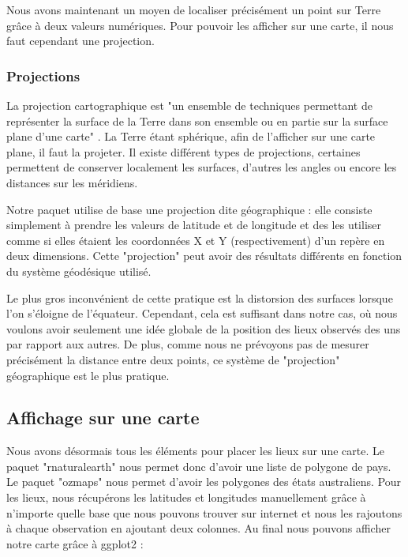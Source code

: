 \documentclass{article}
\begin{document}
Nous avons maintenant un moyen de localiser précisément un point sur Terre grâce à deux valeurs numériques. Pour pouvoir les afficher sur une carte, il nous faut cependant une projection.

\subsubsection{Projections}

La projection cartographique est "un ensemble de techniques permettant de représenter la surface de la Terre dans son ensemble ou en partie sur la surface plane d'une carte" \cite{frwiki:181713838}. La Terre étant sphérique, afin de l'afficher sur une carte plane, il faut la projeter. Il existe différent types de projections, certaines permettent de conserver localement les surfaces, d'autres les angles ou encore les distances sur les méridiens. 

Notre paquet utilise de base une projection dite géographique : elle consiste simplement à prendre les valeurs de latitude et de longitude et des les utiliser comme si elles étaient les coordonnées X et Y (respectivement) d'un repère en deux dimensions. Cette "projection" peut avoir des résultats différents en fonction du système géodésique utilisé. 

Le plus gros inconvénient de cette pratique est la distorsion des surfaces lorsque l'on s'éloigne de l'équateur. Cependant, cela est suffisant dans notre cas, où nous voulons avoir seulement une idée globale de la position des lieux observés des uns par rapport aux autres. De plus, comme nous ne prévoyons pas de mesurer précisément la distance entre deux points, ce système de "projection" géographique est le plus pratique.

\subsection{Affichage sur une carte}

Nous avons désormais tous les éléments pour placer les lieux sur une carte. Le paquet "rnaturalearth" nous permet donc d'avoir une liste de polygone de pays. Le paquet "ozmaps" nous permet d'avoir les polygones des états australiens. Pour les lieux, nous récupérons les latitudes et longitudes manuellement grâce à n'importe quelle base que nous pouvons trouver sur internet et nous les rajoutons à chaque observation en ajoutant deux colonnes. Au final nous pouvons afficher notre carte grâce à ggplot2 : 
\end{document}
